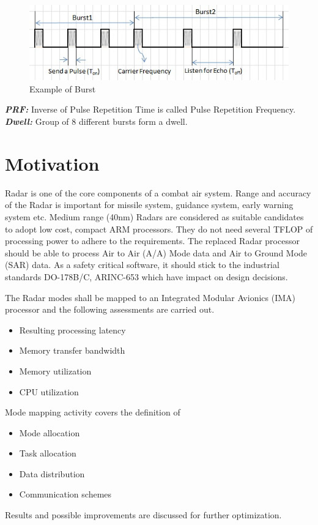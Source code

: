 \begin{figure}[h!]
	\centering
	\includegraphics[]{figures/prf}
	\caption{Example of Burst}
	\label{fig:intro:radar:prf}
\end{figure}
\vspace*{0.2cm}
\noindent
\textsl{\textbf{PRF:}} Inverse of Pulse Repetition Time is called Pulse Repetition Frequency. \\
\noindent
\textsl{\textbf{Dwell:}} Group of 8 different bursts form a dwell.
\FloatBarrier

\section{Motivation}
\label{sec:intro:motivation}
Radar is one of the core components of a combat air system. Range and accuracy of the Radar is important for missile system, guidance system, early warning system etc. Medium range (40nm) Radars are considered as suitable candidates to adopt low cost, compact ARM processors. They do not need several TFLOP of processing power to adhere to the requirements. The replaced Radar processor should be able to process Air to Air (A/A) Mode data and Air to Ground Mode (SAR) data. As a safety critical software, it should stick to the industrial standards DO-178B/C, ARINC-653 which have impact on design decisions.

The Radar modes shall be mapped to an Integrated Modular Avionics (IMA) processor and the following assessments are carried out. 
\begin{itemize}
	\itemsep0em
	\item Resulting processing latency
	\item Memory transfer bandwidth
	\item Memory utilization 
	\item CPU utilization
\end{itemize}

\noindent
Mode mapping activity covers the definition of 
\begin{itemize}
	\itemsep0em
	\item Mode allocation 
	\item Task allocation 
	\item Data distribution
	\item Communication schemes
\end{itemize}
\noindent
Results and possible improvements are discussed for further optimization.

